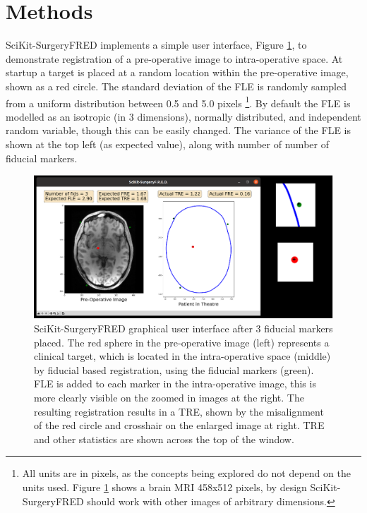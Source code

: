 \section{Methods}
SciKit-SurgeryFRED implements a simple user interface, Figure \ref{fig:surgery_fred}, to demonstrate registration of a pre-operative image to intra-operative space. At startup a target is placed at a random location within the pre-operative image, shown as a red circle. The standard deviation of the \gls{FLE} is randomly sampled from a uniform distribution 
between 0.5 and 5.0 pixels \footnote{All units are in pixels, as the concepts being explored do not depend on the units used. Figure \ref{fig:surgery_fred} shows a brain MRI 458x512 pixels, by design SciKit-SurgeryFRED should work with other images of arbitrary dimensions.}. By default the \gls{FLE} is modelled as an isotropic (in 3 dimensions), normally distributed, and independent random variable, though this can be easily changed. The variance of the \gls{FLE} is shown at the top left (as expected value), along with number of number of fiducial markers. 

\begin{figure}
	\begin{center}
	\includegraphics[width=0.9\linewidth]{scikit-surgeryfred_gui.eps}
		\caption{\label{fig:surgery_fred}SciKit-SurgeryFRED graphical user interface after 3 fiducial markers placed. The red sphere in the pre-operative image (left) represents a clinical target, which is located in the
		intra-operative space (middle) by fiducial based registration, using the fiducial markers (green). FLE is added to each marker in the intra-operative image, this is more clearly visible on the zoomed in images at the right. The resulting registration results in a TRE, shown by the misalignment of the red circle and crosshair 
		on the enlarged image at right. TRE and other statistics are shown across the top
		of the window.}
	\end{center}
\end{figure}

